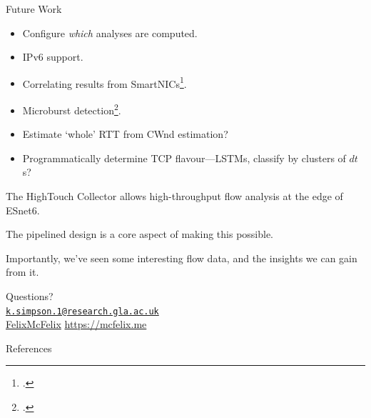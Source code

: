 \documentclass[aspectratio=169,xcolor={dvipsnames}
]{beamer}
\begin{document}
\begin{frame}{Future Work}
	\begin{itemize}[<+- | alert@+>]
		\item Configure \emph{which} analyses are computed.
		\item IPv6 support.
		\item Correlating results from SmartNICs\footcite{DBLP:conf/sosr/KannanJC19}.
		\item Microburst detection\footcite{DBLP:conf/sigcomm/ChenFKRR18}.
		\item Estimate `whole' RTT from CWnd estimation?
		\item Programmatically determine TCP flavour---LSTMs, classify by clusters of $dt$s?
	\end{itemize}
\end{frame}


\begin{frame}[standout]
	The \alert{HighTouch Collector} allows high-throughput flow analysis at the edge of \alert{ESnet6}. \pause
	
	The \alert{pipelined design} is a core aspect of making this possible. \pause
	
	Importantly, we've seen some \alert{interesting flow data}, and the insights we can gain from it. \pause
	
	Questions?\\
	
	{
		\scriptsize
		\vspace{2em}\faEnvelopeO{} \href{mailto:k.simpson.1@research.gla.ac.uk}{\nolinkurl{k.simpson.1@research.gla.ac.uk}}\\
		\small{\faGithub{} \href{https://github.com/felixmcfelix}{FelixMcFelix} \hspace{0.5em} \faGlobe{} \url{https://mcfelix.me}}
	}
\end{frame}

\appendix

\begin{frame}[allowframebreaks]{References}
	\printbibliography[heading=none]
\end{frame}
\end{document}
